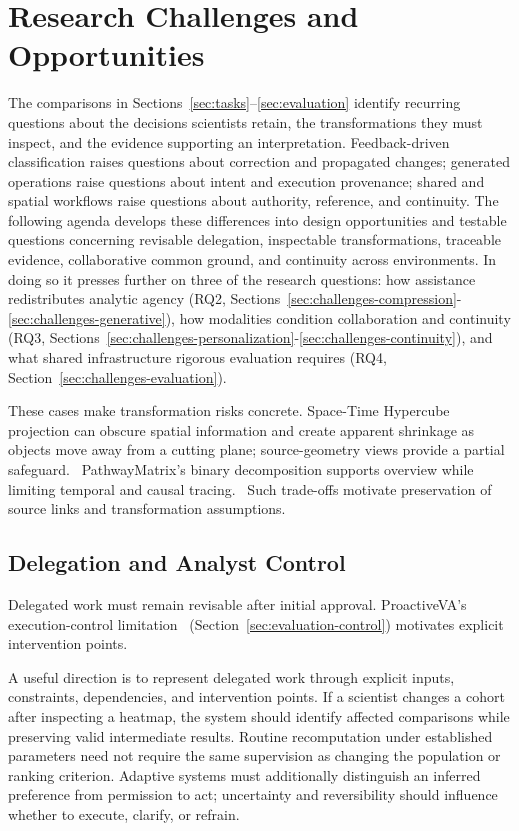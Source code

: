 \section{Research Challenges and Opportunities}
\label{sec:challenges}
The comparisons in Sections~\ref{sec:tasks}--\ref{sec:evaluation} identify recurring questions about the decisions scientists retain, the transformations they must inspect, and the evidence supporting an interpretation. Feedback-driven classification raises questions about correction and propagated changes; generated operations raise questions about intent and execution provenance; shared and spatial workflows raise questions about authority, reference, and continuity. The following agenda develops these differences into design opportunities and testable questions concerning revisable delegation, inspectable transformations, traceable evidence, collaborative common ground, and continuity across environments. In doing so it presses further on three of the research questions: how assistance redistributes analytic agency (RQ2, Sections~\ref{sec:challenges-compression}-\ref{sec:challenges-generative}), how modalities condition collaboration and continuity (RQ3, Sections~\ref{sec:challenges-personalization}-\ref{sec:challenges-continuity}), and what shared infrastructure rigorous evaluation requires (RQ4, Section~\ref{sec:challenges-evaluation}).



These cases make transformation risks concrete. Space-Time Hypercube projection can obscure spatial information and create apparent shrinkage as objects move away from a cutting plane; source-geometry views provide a partial safeguard.~\cite{ExpandedE22} PathwayMatrix's binary decomposition supports overview while limiting temporal and causal tracing.~\cite{ExpandedE37} Such trade-offs motivate preservation of source links and transformation assumptions.

\subsection{Delegation and Analyst Control}
\label{sec:challenges-delegation}
Delegated work must remain revisable after initial approval. ProactiveVA's execution-control limitation~\cite{EvalZhao2025} (Section~\ref{sec:evaluation-control}) motivates explicit intervention points.

A useful direction is to represent delegated work through explicit inputs, constraints, dependencies, and intervention points. If a scientist changes a cohort after inspecting a heatmap, the system should identify affected comparisons while preserving valid intermediate results. Routine recomputation under established parameters need not require the same supervision as changing the population or ranking criterion. Adaptive systems must additionally distinguish an inferred preference from permission to act; uncertainty and reversibility should influence whether to execute, clarify, or refrain.

